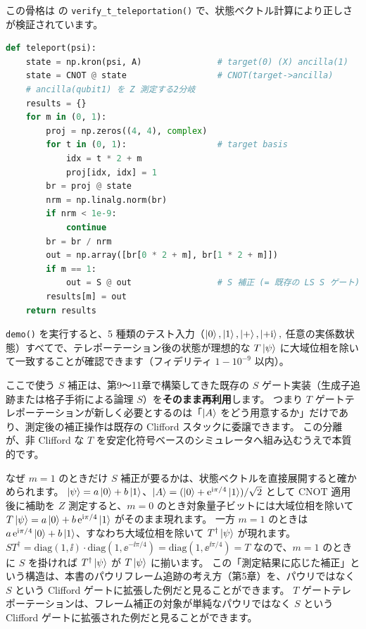この骨格は  の \texttt{verify\_t\_teleportation()} で、状態ベクトル計算により正しさが検証されています。

\begin{lstlisting}[language=Python, caption={T ゲートテレポーテーションの骨格（src/stages/01\_mpp/src/ftqc/t\_gate.py）}]
def teleport(psi):
    state = np.kron(psi, A)               # target(0) (X) ancilla(1)
    state = CNOT @ state                  # CNOT(target->ancilla)
    # ancilla(qubit1) を Z 測定する2分岐
    results = {}
    for m in (0, 1):
        proj = np.zeros((4, 4), complex)
        for t in (0, 1):                  # target basis
            idx = t * 2 + m
            proj[idx, idx] = 1
        br = proj @ state
        nrm = np.linalg.norm(br)
        if nrm < 1e-9:
            continue
        br = br / nrm
        out = np.array([br[0 * 2 + m], br[1 * 2 + m]])
        if m == 1:
            out = S @ out                 # S 補正 (= 既存の LS S ゲート)
        results[m] = out
    return results
\end{lstlisting}

\texttt{demo()} を実行すると、5 種類のテスト入力（$\ket0,\ket1,\ket+,\ket{+\mathrm{i}},$ 任意の実係数状態）すべてで、テレポーテーション後の状態が理想的な $T\ket{\psi}$ に大域位相を除いて一致することが確認できます（フィデリティ $1-10^{-9}$ 以内）。

\begin{notebox}
  ここで使う $S$ 補正は、第9〜11章で構築してきた既存の $S$ ゲート実装（生成子追跡または格子手術による論理 $S$）を\textbf{そのまま再利用}します。
  つまり $T$ ゲートテレポーテーションが新しく必要とするのは「$\ket{A}$ をどう用意するか」だけであり、測定後の補正操作は既存の Clifford スタックに委譲できます。
  この分離が、非 Clifford な $T$ を安定化符号ベースのシミュレータへ組み込むうえで本質的です。
\end{notebox}

なぜ $m=1$ のときだけ $S$ 補正が要るかは、状態ベクトルを直接展開すると確かめられます。
$\ket{\psi}=a\ket0+b\ket1$、$\ket{A}=(\ket0+\mathrm{e}^{\mathrm{i}\pi/4}\ket1)/\sqrt2$ として $\mathrm{CNOT}$ 適用後に補助を $Z$ 測定すると、$m=0$ のとき対象量子ビットには大域位相を除いて $T\ket\psi=a\ket0+b\,\mathrm{e}^{\mathrm{i}\pi/4}\ket1$ がそのまま現れます。
一方 $m=1$ のときは $a\,\mathrm{e}^{\mathrm{i}\pi/4}\ket0+b\ket1$、すなわち大域位相を除いて $T^\dagger\ket\psi$ が現れます。
$S T^\dagger=\mathrm{diag}(1,\ii)\cdot\mathrm{diag}(1,\ee^{-\ii\pi/4})=\mathrm{diag}(1,\ee^{\ii\pi/4})=T$ なので、$m=1$ のときに $S$ を掛ければ $T^\dagger\ket\psi$ が $T\ket\psi$ に揃います。
この「測定結果に応じた補正」という構造は、本書のパウリフレーム追跡の考え方（第5章）を、パウリではなく $S$ という Clifford ゲートに拡張した例だと見ることができます。
$T$ ゲートテレポーテーションは、フレーム補正の対象が単純なパウリではなく $S$ という Clifford ゲートに拡張された例だと見ることができます。

